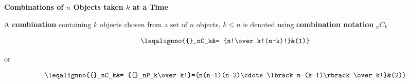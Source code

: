 {\bf Combinations of $n$ Objects taken $k$ at a Time}
\vskip 6pt

A {\bf combination} containing $k$ objects chosen from a set of $n$ objects, $k\leq n$ is denoted using {\bf combination notation} ${}_nC_k$

$$\leqalignno{{}_nC_k&= {n!\over k!(n-k)!}&(1)}$$
\centerline{or}

$$\leqalignno{{}_nC_k&= {{}_nP_k\over k!}={n(n-1)(n-2)\cdots\lbrack n-(k-1)\rbrack\over k!}&(2)}$$

\vfill\eject
